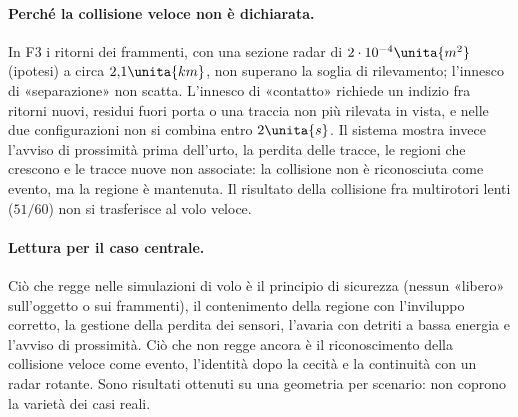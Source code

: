 \paragraph{Perché la collisione veloce non è dichiarata.} In F3 i ritorni dei frammenti, con una sezione radar di $2\cdot10^{-4}\unita{m^2}$ (ipotesi) a circa $2{,}1\unita{km}$, non superano la soglia di rilevamento; l'innesco di «separazione» non scatta. L'innesco di «contatto» richiede un indizio fra ritorni nuovi, residui fuori porta o una traccia non più rilevata in vista, e nelle due configurazioni non si combina entro $2\unita{s}$. Il sistema mostra invece l'avviso di prossimità prima dell'urto, la perdita delle tracce, le regioni che crescono e le tracce nuove non associate: la collisione non è riconosciuta come evento, ma la regione è mantenuta. Il risultato della collisione fra multirotori lenti ($51/60$) non si trasferisce al volo veloce.

\paragraph{Lettura per il caso centrale.} Ciò che regge nelle simulazioni di volo è il principio di sicurezza (nessun «libero» sull'oggetto o sui frammenti), il contenimento della regione con l'inviluppo corretto, la gestione della perdita dei sensori, l'avaria con detriti a bassa energia e l'avviso di prossimità. Ciò che non regge ancora è il riconoscimento della collisione veloce come evento, l'identità dopo la cecità e la continuità con un radar rotante. Sono risultati ottenuti su una geometria per scenario: non coprono la varietà dei casi reali.

